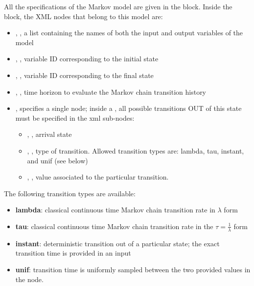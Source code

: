 All the specifications of the Markov model are given in the  block.
Inside the  block, the XML nodes that belong to this model are:
\begin{itemize}
  \item  {}, , a list containing the names of both the input and output variables of the model
  \item  {}, , variable ID corresponding to the initial state
  \item  {}, , variable ID corresponding to the final state
  \item  {}, , time horizon to evaluate the Markov chain transition history
  \item  {}, specifies a single node; inside a , all possible transitions OUT of this state must be specified in the  xml sub-nodes:
	  \begin{itemize}
	  	\item {}, , arrival state
	    \item {}, , type of transition. Allowed transition types are:
      lambda, tau, instant, and unif (see below)
	    \item {}, , value associated to the particular transition.
	  \end{itemize}
\end{itemize}

The following transition types are available:
\begin{itemize}
  \item \textbf{lambda}: classical continuous time Markov chain transition rate in $\lambda$ form
  \item \textbf{tau}: classical continuous time Markov chain transition rate in the $\tau = \frac{1}{\lambda}$ form
  \item \textbf{instant}: deterministic transition out of a particular state; the exact transition time is provided in an input
  \item \textbf{unif}: transition time is uniformly sampled between the two provided values in the  node.
\end{itemize}

